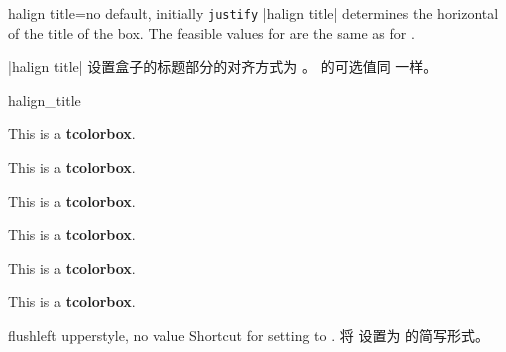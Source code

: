 \begin{docTcbKey}[][doc new=2022-10-30]{halign title}{=}{no default, initially \texttt{justify}}
|halign title| determines the horizontal  of the title of the box.
The feasible values for  are the same as for .

|halign title| 设置盒子的标题部分的对齐方式为 。
 的可选值同  一样。

\begin{exdispExample}{halign_title}
\begin{tcbraster}[raster columns=3,fonttitle=\bfseries,
colback=red!5!white,colframe=red!75!black]

\begin{tcolorbox}[adjusted title=flush center,halign title=flush center]
This is a \textbf{tcolorbox}.
\end{tcolorbox}
\begin{tcolorbox}[adjusted title=flush left,halign title=flush left]
This is a \textbf{tcolorbox}.
\end{tcolorbox}
\begin{tcolorbox}[adjusted title=flush right,halign title=flush right]
This is a \textbf{tcolorbox}.
\end{tcolorbox}
\begin{tcolorbox}[adjusted title=center,halign title=center]
This is a \textbf{tcolorbox}.
\end{tcolorbox}
\begin{tcolorbox}[adjusted title=left,halign title=left]
This is a \textbf{tcolorbox}.
\end{tcolorbox}
\begin{tcolorbox}[adjusted title=right,halign title=right]
This is a \textbf{tcolorbox}.
\end{tcolorbox}

\end{tcbraster}
\end{exdispExample}
\end{docTcbKey}





\begin{docTcbKey}[][doc updated=2015-05-07]{flushleft upper}{}{style, no value}
Shortcut for setting  to .
将  设置为  的简写形式。
\end{docTcbKey}

